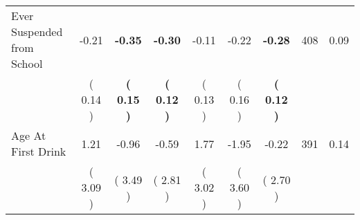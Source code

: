 \begin{tabular}{lcccccccc}
Ever Suspended from School &     -0.21 & \textbf{    -0.35} & \textbf{    -0.30} &     -0.11 &     -0.22 & \textbf{    -0.28} & 408 &       0.09 \\ 
 & (     0.14 ) & \textbf{(     0.15 )} & \textbf{(     0.12 )} & (     0.13 ) & (     0.16 ) & \textbf{(     0.12 )} & \\
Age At First Drink &      1.21 &     -0.96 &     -0.59 &      1.77 &     -1.95 &     -0.22 & 391 &       0.14 \\ 
 & (     3.09 ) & (     3.49 ) & (     2.81 ) & (     3.02 ) & (     3.60 ) & (     2.70 ) & \\
\bottomrule
\end{tabular}
